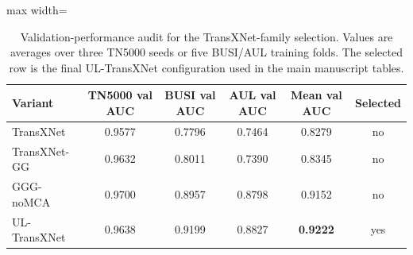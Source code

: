 \begin{table}[t]
    \centering
    \small
    \caption{Validation-performance audit for the TransXNet-family selection. Values are averages over three TN5000 seeds or five BUSI/AUL training folds. The selected row is the final UL-TransXNet configuration used in the main manuscript tables.}
    \label{tab:validation_selection_audit}
    \begin{adjustbox}{max width=\columnwidth}
    \begin{tabular}{lccccc}
        \toprule
        Variant & TN5000 val AUC & BUSI val AUC & AUL val AUC & Mean val AUC & Selected \\
        \midrule
        TransXNet & 0.9577 & 0.7796 & 0.7464 & 0.8279 & no \\
        TransXNet-GG & 0.9632 & 0.8011 & 0.7390 & 0.8345 & no \\
        GGG-noMCA & 0.9700 & 0.8957 & 0.8798 & 0.9152 & no \\
        UL-TransXNet & 0.9638 & 0.9199 & 0.8827 & \textbf{0.9222} & yes \\
        \bottomrule
    \end{tabular}
    \end{adjustbox}
\end{table}
